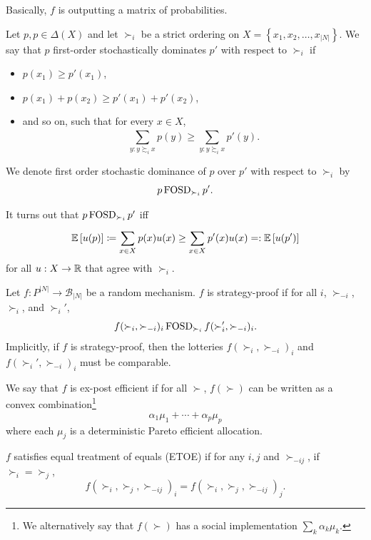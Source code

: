 Basically, $f$ is outputting a matrix of probabilities.

\begin{definition}
	Let $p,p \in \Delta(X)$ and let $\succ_i$ be a strict ordering on $X = \left\{x_1,x_2,\ldots,x_{\left| N \right|}\right\}$.
	We say that $p$ first-order stochastically dominates $p'$ with respect to $\succ_i$ if
	\begin{itemize}
		\item $p(x_1) \ge p'(x_1)$,
		\item $p(x_1) + p(x_2) \ge p'(x_1) + p'(x_2)$,
		\item and so on, such that for every $x \in X$, \[
				\sum\limits_{y : y \succsim_i x} p(y) \ge \sum\limits_{y: y \succsim_i x}^{} p'(y)
		.\] 
	\end{itemize}
	We denote first order stochastic dominance of $p$ over $p'$ with respect to $\succ_i$ by \[
		p \operatorname{FOSD}_{\succ_i}p'
	.\] 
\end{definition}

It turns out that $p \operatorname{FOSD}_{\succ_i} p'$ iff 
\[
	\mathbb{E}\left[u(p)\right] \coloneqq  \sum\limits_{x \in X}^{} p(x)u(x) \ge \sum\limits_{x \in X}^{} p'(x)u(x) =: \mathbb{E}\left[u(p')\right] 
\] 
for all $u: X \to \mathbb{R} $ that agree with $\succ_i$.

\begin{definition}
	Let $f: P^{\left| N \right|}\to \mathscr{B}_{\left| N \right|}$ be a random mechanism. $f$ is strategy-proof if for all $i$, $\succ_{-i}$, $\succ_i$, and $\succ_{i}'$,
	\[
		f(\succ_i,\succ_{-i})_i \operatorname{FOSD}_{\succ_i} f(\succ_i', \succ_{-i})_i
	.\]Implicitly, if $f$ is strategy-proof, then the lotteries $f(\succ_i,\succ_{-i})_i$ and $f(\succ_i',\succ_{-i})_i$ must be comparable.

	We say that $f$ is ex-post efficient if for all $\succ$, $f(\succ)$ can be written as a convex combination\footnote{We alternatively say that $f(\succ)$ has a social implementation $\sum_k \alpha_k \mu_k$.} \[
		\alpha_1 \mu_1 + \cdots + \alpha_p \mu_p
	\] where each $\mu_j$ is a deterministic Pareto efficient allocation.

	$f$ satisfies equal treatment of equals (ETOE) if for any $i,j$ and $\succ_{-ij}$, if $\succ_i = \succ_j$,  \[
		f(\succ_i,\succ_j,\succ_{-ij})_i = f\left( \succ_i,\succ_j,\succ_{-ij} \right)_{j}
	.\]  
\end{definition}

